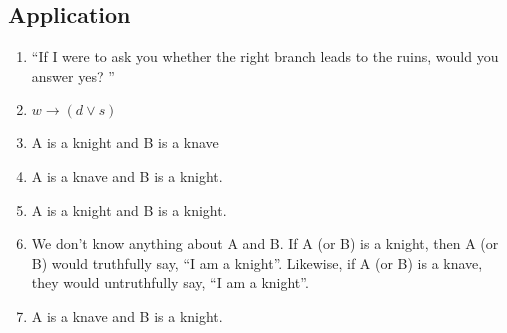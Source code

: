 \documentclass{sig-alternate-05-2015}
\begin{document}
\subsection{Application}

\begin{enumerate}
\item \textquotedblleft If I were to ask you whether the right branch
leads to the ruins, would you answer yes? \textquotedblright
\item $w \rightarrow (d \vee s)$
\item A is a knight and B is a knave
\item A is a knave and B is a knight.
\item A is a knight and B is a knight.
\item We don\textquoteright t know anything about A and B. If A (or B) is a knight, then A (or B) would
truthfully say, \textquotedblleft I am a knight\textquotedblright. Likewise, if A (or B) is a knave, they would untruthfully
say, \textquotedblleft I am a knight\textquotedblright.
\item A is a knave and B is a knight.
\end{enumerate}
\end{document}
